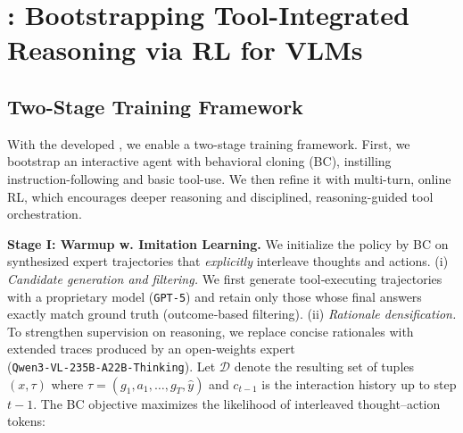 \section{\ours: Bootstrapping Tool-Integrated Reasoning via RL for VLMs}
\label{sec:training}

\subsection{Two-Stage Training Framework}
With the developed \env, we enable a two-stage training framework. First, we bootstrap an interactive agent with behavioral cloning (BC), instilling instruction-following and basic tool-use. We then refine it with multi-turn, online RL, which encourages deeper reasoning and disciplined, reasoning-guided tool orchestration.

\noindent \textbf{Stage I: Warmup w. Imitation Learning.}
We initialize the policy by BC on synthesized expert trajectories that \emph{explicitly} interleave thoughts and actions. 
(i) \textit{Candidate generation and filtering.} We first generate tool‑executing trajectories with a proprietary model (\texttt{GPT‑5}) and retain only those whose final answers exactly match ground truth (outcome‑based filtering). 
(ii) \textit{Rationale densification.} To strengthen supervision on reasoning, we replace concise rationales with extended traces produced by an open‑weights expert (\texttt{Qwen3‑VL‑235B‑A22B‑Thinking}). 
Let $\mathcal{D}$ denote the resulting set of tuples $(x,\tau)$ where $\tau{=}(g_1,a_1,\ldots,g_T,\hat{y})$ and $c_{t-1}$ is the interaction history up to step $t{-}1$. The BC objective maximizes the likelihood of interleaved thought–action tokens:
